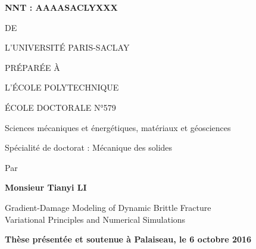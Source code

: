 
\begin{titlepage}

\begin{flushleft}
 \hfill
{}
\end{flushleft}
\vspace{10pt}

\begin{mdframed}
\begin{flushleft}
\large\textbf{NNT : AAAASACLYXXX}
\end{flushleft}
\vspace{20pt}

\begin{center}
{\color{color02}{\LARGE THÈSE DE DOCTORAT}

\vspace{8pt}
{\LARGE DE}

\vspace{8pt}
{\LARGE L'UNIVERSITÉ PARIS-SACLAY}

\vspace{8pt}
{\LARGE PRÉPARÉE À}

\vspace{8pt}
{\LARGE L'ÉCOLE POLYTECHNIQUE}}

\vspace{24pt}
{\Large ÉCOLE DOCTORALE N°579}

\vspace{5pt}
{\Large Sciences mécaniques et énergétiques, matériaux et géosciences}

\vspace{16pt}
{\Large Spécialité de doctorat : Mécanique des solides}
\vspace{12pt}

{\large Par}
\vspace{12pt}

{\LARGE\bfseries Monsieur Tianyi LI}
\vspace{20pt}

{\LARGE \sffamily
Gradient-Damage Modeling of Dynamic Brittle Fracture \\ \vspace{0.2cm}
Variational Principles and Numerical Simulations}
\end{center}

\vfill
\begin{flushleft}
\large
\textbf{Thèse présentée et soutenue à Palaiseau, le 6 octobre 2016}
\vspace{15pt}


\end{flushleft}
\end{mdframed}
\end{titlepage}
